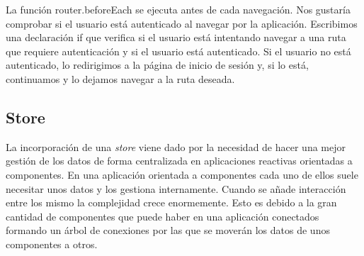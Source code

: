 La función router.beforeEach se ejecuta antes de cada navegación. Nos gustaría comprobar si el usuario está autenticado al navegar por la aplicación.
Escribimos una declaración if que verifica si el usuario está intentando navegar a una ruta que requiere autenticación y si el usuario está autenticado. Si el usuario no está autenticado, lo redirigimos a la página de inicio de sesión y, si lo está, continuamos y lo dejamos navegar a la ruta deseada.

\subsection{Store}
%

La incorporación de una \textit{store} viene dado por la necesidad de hacer una mejor gestión de los datos de forma centralizada en aplicaciones reactivas orientadas a componentes. En una aplicación orientada a componentes cada uno de ellos suele necesitar unos datos y los gestiona internamente. Cuando se añade interacción entre los mismo la complejidad crece enormemente. Esto es debido a la gran cantidad de componentes que puede haber en una aplicación conectados formando un árbol de conexiones por las que se moverán los datos de unos componentes a otros.

